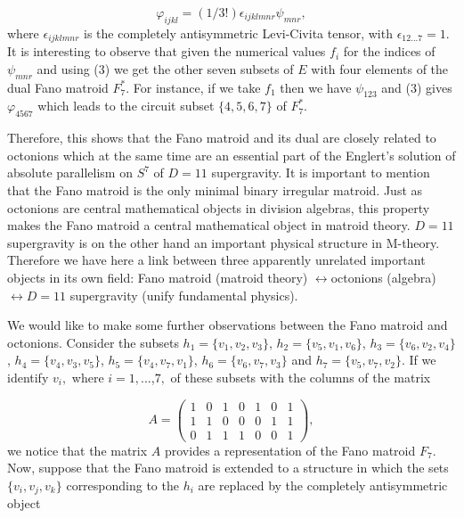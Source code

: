 \documentclass[a4paper,12pt]{article}
\begin{document}
\begin{equation}
\varphi _{ijkl}=(1/3!)\epsilon _{ijklmnr}\psi _{mnr},  \label{3}
\end{equation}
where $\epsilon _{ijklmnr}$ is the completely antisymmetric Levi-Civita
tensor, with $\epsilon _{12...7}=1$. It is interesting to observe that given
the numerical values $f_{i}$ for the indices of $\psi _{mnr}$ and using (3)
we get the other seven subsets of $E$ with four elements of the dual Fano
matroid $F_{7}^{\ast }.$ For instance, if we take $f_{1}$ then we have $\psi
_{123}$ and (3) gives $\varphi _{4567}$ which leads to the circuit subset $%
\{4,5,6,7\}$ of $F_{7}^{\ast }.$

Therefore, this shows that the Fano matroid and its dual are closely related
to octonions which at the same time are an essential part of the Englert's
solution of absolute parallelism on $S^{7}$ of $D=11$ supergravity. It is
important to mention that the Fano matroid is the only minimal binary
irregular matroid. Just as octonions are central mathematical objects in
division algebras, this property makes the Fano matroid a central
mathematical object in matroid theory. $D=11$ supergravity is on the other
hand an important physical structure in M-theory. Therefore we have here a
link between three apparently unrelated important objects in its own field:
Fano matroid (matroid theory) $\leftrightarrow $octonions (algebra) $%
\leftrightarrow D=11$ supergravity (unify fundamental physics).

We would like to make some further observations between the Fano matroid and
octonions. Consider the subsets $h_{1}=\{v_{1},v_{2},v_{3}\}$, $%
h_{2}=\{v_{5},v_{1},v_{6}\}$, $h_{3}=\{v_{6},v_{2},v_{4}\}$, $%
h_{4}=\{v_{4},v_{3},v_{5}\}$, $h_{5}=\{v_{4},v_{7},v_{1}\}$, $%
h_{6}=\{v_{6},v_{7},v_{3}\}$ and $h_{7}=\{v_{5},v_{7},v_{2}\}.$ If we
identify $v_{i},$ where $i=1,...$,$7,$ of these subsets with the columns of
the matrix

\begin{equation}
A=\left( 
\begin{array}{ccccccc}
1 & 0 & 1 & 0 & 1 & 0 & 1 \\ 
1 & 1 & 0 & 0 & 0 & 1 & 1 \\ 
0 & 1 & 1 & 1 & 0 & 0 & 1
\end{array}
\right) ,  \label{4}
\end{equation}
we notice that the matrix $A$ provides a representation of the Fano matroid $%
F_{7}$. Now, suppose that the Fano matroid is extended to a structure in
which the sets $\{v_{i},v_{j},v_{k}\}$ corresponding to the $h_{i}$ are
replaced by the completely antisymmetric object
\end{document}

